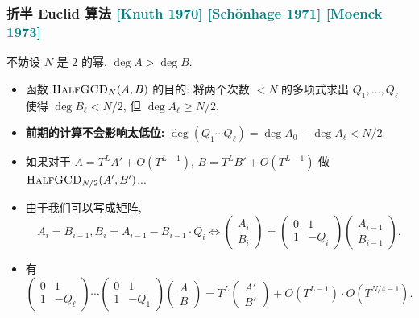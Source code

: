 \documentclass{ctexbeamer}
\newcommand{\cnote}[2][\footnotesize]{\textcolor{teal}{#1[#2]}}
\begin{document}
\begin{frame}
  \frametitle{折半 Euclid 算法 \cnote{Knuth 1970} \cnote{Sch\"onhage 1971} \cnote{Moenck 1973}}

  不妨设 $N$ 是 $2$ 的幂, $\deg A > \deg B$.

  \begin{itemize}
    \item<1-> 函数 $\textsc{HalfGCD}_N(A,B)$ 的目的: 将两个次数 $< N$ 的多项式求出 $Q_1,\dots, Q_\ell$ 使得
    $\deg B_\ell < N/2$, 但 $\deg A_\ell \geq N/2$.
    \item<2-> \textbf{前期的计算不会影响太低位:} $\deg (Q_1 \cdots Q_\ell) = \deg A_0 - \deg A_\ell < N/2$.
    \item<3-> 如果对于 $A = T^L A' + O(T^{L-1})$, $B = T^L B' + O(T^{L-1})$ 做
    $\textsc{HalfGCD}_{N/2}(A', B')$...
    \item<4-> 由于我们可以写成矩阵,
    \begin{equation}
      A_i = B_{i - 1}, B_i = A_{i - 1} - B_{i-1} \cdot Q_i
      \iff
      \begin{pmatrix}
        A_i \\ B_i
      \end{pmatrix} = \begin{pmatrix}
        0 & 1 \\ 1 & -Q_i
      \end{pmatrix} \begin{pmatrix}
        A_{i-1} \\ B_{i-1}
      \end{pmatrix}.
    \end{equation}
    \item<4-> 有
    \begin{equation}
      \begin{pmatrix}
        0 & 1 \\ 1 & -Q_\ell
      \end{pmatrix} \cdots \begin{pmatrix}
        0 & 1 \\ 1 & -Q_1
      \end{pmatrix} 
      \begin{pmatrix}
        A\\ B
      \end{pmatrix}
      = T^L\begin{pmatrix}
        A' \\ B'
      \end{pmatrix} + O(T^{L-1}) \cdot O(T^{N/4 - 1}).
    \end{equation}
  \end{itemize}

\end{frame}
\end{document}

